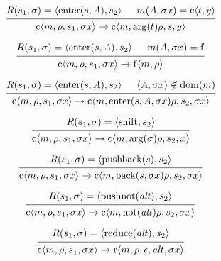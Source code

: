 \documentclass[12pt]{article}
\begin{document}
\pagestyle{empty}

\[
  \begin{prooftree}
    \hypo{R(s_1, \sigma) = \langle\mathrm{enter}(s, A), s_2\rangle}
    \hypo{m(A, \sigma x) = \mathrm{c}\langle t, y\rangle}
    \infer2{\mathrm{c}\langle m, \rho, s_1, \sigma x\rangle \to \mathrm{c}\langle m, \mathrm{arg}(t) \rho, s, y\rangle}
  \end{prooftree}
\]

\[
  \begin{prooftree}
    \hypo{R(s_1, \sigma) = \langle\mathrm{enter}(s, A), s_2\rangle}
    \hypo{m(A, \sigma x) = \mathrm{f}}
    \infer2{\mathrm{c}\langle m, \rho, s_1, \sigma x\rangle \to \mathrm{f}\langle m, \rho\rangle}
  \end{prooftree}
\]

\[
  \begin{prooftree}
    \hypo{R(s_1, \sigma) = \langle\mathrm{enter}(s, A), s_2\rangle}
    \hypo{\langle A, \sigma x\rangle \not\in \mathrm{dom}(m)}
    \infer2{\mathrm{c}\langle m, \rho, s_1, \sigma x\rangle \to \mathrm{c}\langle m, \mathrm{enter}(s, A, \sigma x) \rho, s_2, \sigma x\rangle}
  \end{prooftree}
\]

\[
  \begin{prooftree}
    \hypo{R(s_1, \sigma) = \langle\mathrm{shift}, s_2\rangle}
    \infer1{\mathrm{c}\langle m, \rho, s_1, \sigma x\rangle \to \mathrm{c}\langle m, \mathrm{arg}(\sigma) \rho, s_2, x\rangle}
  \end{prooftree}
\]

\[
  \begin{prooftree}
    \hypo{R(s_1, \sigma) = \langle\mathrm{pushback}(s), s_2\rangle}
    \infer1{\mathrm{c}\langle m, \rho, s_1, \sigma x\rangle \to \mathrm{c}\langle m, \mathrm{back}(s, \sigma x) \rho, s_2, \sigma x\rangle}
  \end{prooftree}
\]

\[
  \begin{prooftree}
    \hypo{R(s_1, \sigma) = \langle\mathrm{pushnot}(\mathit{alt}), s_2\rangle}
    \infer1{\mathrm{c}\langle m, \rho, s_1, \sigma x\rangle \to \mathrm{c}\langle m, \mathrm{not}(\mathit{alt}) \rho, s_2, \sigma x\rangle}
  \end{prooftree}
\]

\[
  \begin{prooftree}
    \hypo{R(s_1, \sigma) = \langle\mathrm{reduce}(\mathit{alt}), s_2\rangle}
    \infer1{\mathrm{c}\langle m, \rho, s_1, \sigma x\rangle \to \mathrm{r}\langle m, \rho, \epsilon, \mathit{alt}, \sigma x\rangle}
  \end{prooftree}
\]
\end{document}

